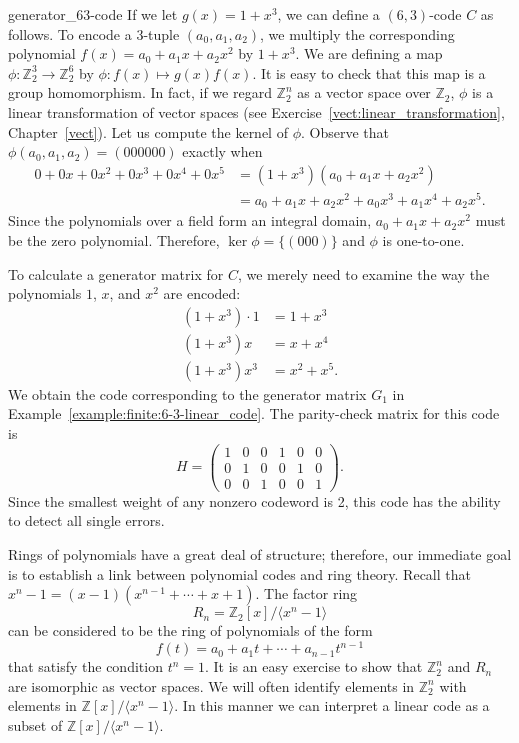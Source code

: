 \begin{example}{generator_63-code}
If we let $g(x)= 1 + x^3$, we can define a $(6,3)$-code $C$ as follows.  To encode a 3-tuple $( a_0, a_1, a_2 )$, we multiply the corresponding polynomial $f(x) = a_0 + a_1 x + a_2 x^2$ by $1 + x^3$.  We are defining a map $\phi : {\mathbb Z}_2^3 \rightarrow {\mathbb Z}_2^6$ by $\phi  : f(x) \mapsto g(x) f(x)$.  It is easy to check that this map is a group homomorphism.  In fact, if we regard ${\mathbb Z}_2^n$ as a vector space over ${\mathbb Z}_2$, $\phi$ is a linear transformation of vector spaces (see Exercise~\ref{vect:linear_transformation}, Chapter~\ref{vect}).  Let us compute the kernel of $\phi$.  Observe that $\phi ( a_0, a_1, a_2 ) = (000000)$ exactly when 
\begin{align*}
0 + 0x + 0x^2 + 0x^3 + 0x^4 + 0 x^5 
& = (1 + x^3) ( a_0 + a_1 x + a_2 x^2 ) \\ 
& = a_0 + a_1 x + a_2 x^2 + a_0 x^3 + a_1 x^4 + a_2 x^5.
\end{align*}
Since the polynomials over a field form an integral domain, $a_0 + a_1 x + a_2 x^2$ must be the zero polynomial. Therefore, $\ker \phi = \{ (000) \}$ and $\phi$ is one-to-one. 
 

To calculate a generator matrix for $C$, we merely need to examine the way the polynomials $1$, $x$, and $x^2$ are encoded:
\begin{align*}
(1 + x^3) \cdot 1 & = 1 + x^3 \\
(1 + x^3)x & = x + x^4 \\
(1 + x^3)x^3 & = x^2 + x^5. 
\end{align*}
We obtain the code corresponding to the generator matrix $G_1$ in Example~\ref{example:finite:6-3-linear_code}.  The parity-check matrix for this code is
\[
H
= 
\begin{pmatrix}
1 & 0 & 0 & 1 & 0 & 0 \\
0 & 1 & 0 & 0 & 1 & 0 \\
0 & 0 & 1 & 0 & 0 & 1 
\end{pmatrix}.
\]
Since the smallest weight of any nonzero codeword is 2, this code has the ability to detect all single errors.  
\end{example}


Rings of polynomials have a great deal of structure; therefore, our immediate goal is to establish a link between polynomial codes and ring theory. Recall that $x^n - 1 = (x - 1)( x^{n-1} + \cdots + x + 1)$.  The factor ring 
\[
R_n = {\mathbb Z}_2[x]/ \langle x^n - 1 \rangle
\] 
can be considered to be the ring of polynomials of the form 
\[
f(t) = a_0 + a_1 t + \cdots + a_{n-1} t^{n-1}
\]
that satisfy the condition $t^n = 1$.  It is an easy exercise to show that ${\mathbb Z}_2^n$ and $R_n$ are isomorphic as vector spaces.  We will often identify elements in ${\mathbb Z}_2^n$ with elements in
${\mathbb Z}[x] / \langle x^n - 1 \rangle$.  In this manner we can interpret a linear code as a subset of ${\mathbb Z}[x] / \langle x^n - 1 \rangle$.  

